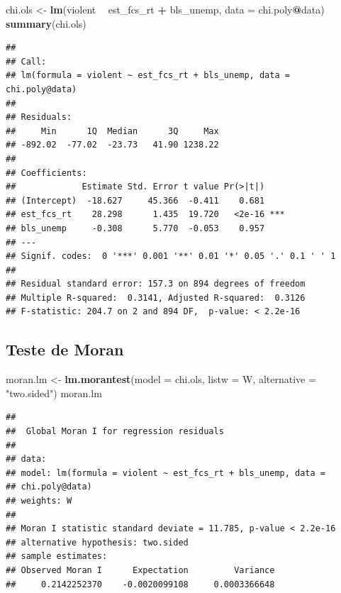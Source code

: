 \documentclass[12pt,]{article}
\newenvironment{Shaded}{\begin{snugshade}}{\end{snugshade}}
\newcommand{\KeywordTok}[1]{\textcolor[rgb]{0.13,0.29,0.53}{\textbf{#1}}}
\newcommand{\DataTypeTok}[1]{\textcolor[rgb]{0.13,0.29,0.53}{#1}}
\newcommand{\StringTok}[1]{\textcolor[rgb]{0.31,0.60,0.02}{#1}}
\newcommand{\OperatorTok}[1]{\textcolor[rgb]{0.81,0.36,0.00}{\textbf{#1}}}
\newcommand{\NormalTok}[1]{#1}
\begin{document}
\begin{Shaded}
\begin{Highlighting}[]
\NormalTok{chi.ols <-}\StringTok{ }\KeywordTok{lm}\NormalTok{(violent }\OperatorTok{~}\StringTok{ }\NormalTok{est_fcs_rt }\OperatorTok{+}\StringTok{ }\NormalTok{bls_unemp, }\DataTypeTok{data =}\NormalTok{ chi.poly}\OperatorTok{@}\NormalTok{data)}
\KeywordTok{summary}\NormalTok{(chi.ols)}
\end{Highlighting}
\end{Shaded}

\begin{verbatim}
## 
## Call:
## lm(formula = violent ~ est_fcs_rt + bls_unemp, data = chi.poly@data)
## 
## Residuals:
##     Min      1Q  Median      3Q     Max 
## -892.02  -77.02  -23.73   41.90 1238.22 
## 
## Coefficients:
##             Estimate Std. Error t value Pr(>|t|)    
## (Intercept)  -18.627     45.366  -0.411    0.681    
## est_fcs_rt    28.298      1.435  19.720   <2e-16 ***
## bls_unemp     -0.308      5.770  -0.053    0.957    
## ---
## Signif. codes:  0 '***' 0.001 '**' 0.01 '*' 0.05 '.' 0.1 ' ' 1
## 
## Residual standard error: 157.3 on 894 degrees of freedom
## Multiple R-squared:  0.3141, Adjusted R-squared:  0.3126 
## F-statistic: 204.7 on 2 and 894 DF,  p-value: < 2.2e-16
\end{verbatim}

\subsection{Teste de Moran}\label{teste-de-moran}

\begin{Shaded}
\begin{Highlighting}[]
\NormalTok{moran.lm <-}\StringTok{ }\KeywordTok{lm.morantest}\NormalTok{(}\DataTypeTok{model =}\NormalTok{ chi.ols, }\DataTypeTok{listw =}\NormalTok{ W, }
                         \DataTypeTok{alternative =} \StringTok{"two.sided"}\NormalTok{)}
\NormalTok{moran.lm}
\end{Highlighting}
\end{Shaded}

\begin{verbatim}
## 
##  Global Moran I for regression residuals
## 
## data:  
## model: lm(formula = violent ~ est_fcs_rt + bls_unemp, data =
## chi.poly@data)
## weights: W
## 
## Moran I statistic standard deviate = 11.785, p-value < 2.2e-16
## alternative hypothesis: two.sided
## sample estimates:
## Observed Moran I      Expectation         Variance 
##     0.2142252370    -0.0020099108     0.0003366648
\end{verbatim}
\end{document}
